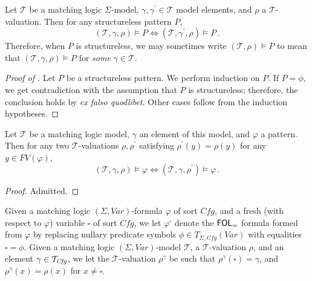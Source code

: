\begin{lemma}\label{lem:structurelessSemantics}
Let $\mathcal{T}$ be a matching logic $\Sigma$-model, $\gamma,\gamma^\prime \in \mathcal{T}$ model elements,
and $\rho$ a $\mathcal{T}$-valuation. Then for any structureless pattern $P$,
\begin{equation*}
    (\mathcal{T}, \gamma, \rho) \vDash P \iff (\mathcal{T}, \gamma^\prime, \rho) \vDash P \, .
\end{equation*}
Therefore, when $P$ is structureless, we may sometimes write $(\mathcal{T}, \rho) \vDash P$ to mean that 
$(\mathcal{T}, \gamma, \rho) \vDash P$ for \emph{some} $\gamma \in \mathcal{T}$.
\end{lemma}
\begin{proof}[Proof of ]
Let $P$ be a structureless pattern.
We perform induction on $P$.
If $P = \phi$, we get contradiction with the assumption that $P$ is structureless;
therefore, the conclusion holds by \emph{ex falso quodlibet}.
Other cases follow from the induction hypotheses.
\end{proof}

\begin{lemma}\label{lem:unusedVariables}
    Let $\mathcal{T}$ be a matching logic model, $\gamma$ an element of this model,
    and $\varphi$ a pattern.
    Then for any two $\mathcal{T}$-valuations $\rho,\rho^\prime$
    satisfying $\rho^\prime(y) = \rho(y)$ for any $y \in \mathit{FV}(\varphi)$,
    \begin{equation*}
        (\mathcal{T}, \gamma, \rho) \vDash \varphi \iff (\mathcal{T}, \gamma, \rho^\prime) \vDash \varphi \, .
    \end{equation*}
\end{lemma}
\begin{proof}
Admitted.
\end{proof}

\begin{definition}
    Given a  matching logic $(\Sigma, \mathit{Var})$-formula $\varphi$ of sort $\mathit{Cfg}$,
    and a fresh (with respect to $\varphi$) variable $\square$ of sort $\mathit{Cfg}$,
    we let $\varphi^\square$ denote the $\mathsf{FOL}_{=}$ formula formed from $\varphi$ by replacing
    nullary predicate symbols $\phi \in T_{\Sigma, \mathit{Cfg}}(\mathit{Var})$
    with equalities $\square = \phi$.
    Given a matching logic $(\Sigma, \mathit{Var})$-model $\mathcal{T}$, a $\mathcal{T}$-valuation $\rho$,
    and an element $\gamma \in \mathcal{T}_{\mathit{Cfg}}$,
    we let the $\mathcal{T}$-valuation $\rho^\gamma$ be such that $\rho^\gamma(\square) = \gamma$,
    and $\rho^\gamma(x) = \rho(x)$ for $x \not = \square$.
\end{definition}

